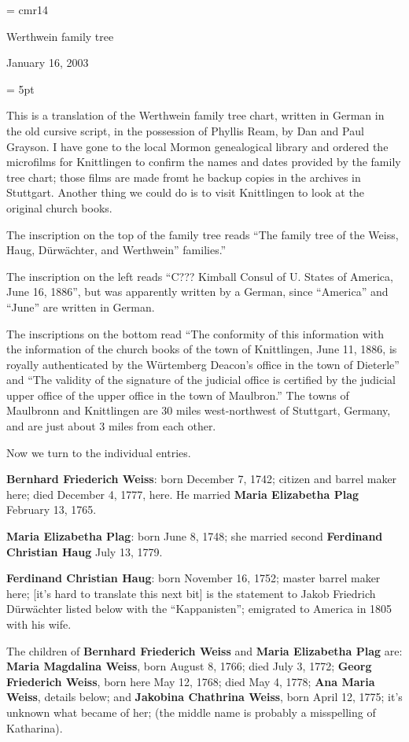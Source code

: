 

\font\big = cmr14
\centerline{\big Werthwein family tree}
\centerline{January 16, 2003}

\parskip = 5pt

This is a translation of the Werthwein family tree chart, written in German
in the old cursive script, in the possession of Phyllis Ream, by Dan and Paul
Grayson.  I have gone to the local Mormon genealogical library and ordered
the microfilms for Knittlingen to confirm the names and dates provided by the
family tree chart; those films are made fromt he backup copies in the
archives in Stuttgart.  Another thing we could do is to visit Knittlingen to
look at the original church books.

The inscription on the top of the family tree reads ``The family tree of
the Weiss, Haug, D\"urw\"achter, and Werthwein'' families.''

The inscription on the left reads ``C??? Kimball Consul of U. States of
America, June 16, 1886'', but was apparently written by a German, since
``America'' and ``June'' are written in German.

The inscriptions on the bottom read ``The conformity of this information with the information of
the church books of the town of Knittlingen, June 11, 1886, is royally authenticated by the
W\"urtemberg Deacon's office in the town of Dieterle'' and ``The validity of the signature of the
judicial office is certified by the judicial upper office of the upper office in the town of
Maulbron.''  The towns of Maulbronn and Knittlingen are 30 miles west-northwest of Stuttgart,
Germany, and are just about 3 miles from each other.

Now we turn to the individual entries.

{\bf Bernhard Friederich Weiss}: born December 7, 1742; citizen and barrel
maker here; died December 4, 1777, here.  He married {\bf Maria Elizabetha
Plag} February 13, 1765.

{\bf Maria Elizabetha Plag}: born June 8, 1748; she married second {\bf
  Ferdinand Christian Haug} July 13, 1779.

{\bf Ferdinand Christian Haug}: born November 16, 1752; master barrel maker here; [it's hard to
translate this next bit] is the statement to Jakob Friedrich D\"urw\"achter{} listed below with the
``Kappanisten''; emigrated to America in 1805 with his wife.

The children of {\bf Bernhard Friederich Weiss} and {\bf Maria Elizabetha
  Plag} are:
{\bf Maria Magdalina Weiss}, born August 8, 1766; died July 3, 1772;
{\bf Georg Friederich Weiss}, born here May 12, 1768; died May 4, 1778;
{\bf Ana Maria Weiss}, details below; and
{\bf Jakobina Chathrina Weiss}, born April 12, 1775; it's unknown what became of her; (the middle
  name is probably a misspelling of Katharina).

